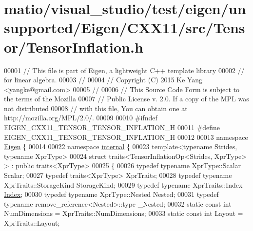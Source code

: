\hypertarget{matio_2visual__studio_2test_2eigen_2unsupported_2_eigen_2_c_x_x11_2src_2_tensor_2_tensor_inflation_8h_source}{}\section{matio/visual\+\_\+studio/test/eigen/unsupported/\+Eigen/\+C\+X\+X11/src/\+Tensor/\+Tensor\+Inflation.h}
\label{matio_2visual__studio_2test_2eigen_2unsupported_2_eigen_2_c_x_x11_2src_2_tensor_2_tensor_inflation_8h_source}

\begin{DoxyCode}
00001 \textcolor{comment}{// This file is part of Eigen, a lightweight C++ template library}
00002 \textcolor{comment}{// for linear algebra.}
00003 \textcolor{comment}{//}
00004 \textcolor{comment}{// Copyright (C) 2015 Ke Yang <yangke@gmail.com>}
00005 \textcolor{comment}{//}
00006 \textcolor{comment}{// This Source Code Form is subject to the terms of the Mozilla}
00007 \textcolor{comment}{// Public License v. 2.0. If a copy of the MPL was not distributed}
00008 \textcolor{comment}{// with this file, You can obtain one at http://mozilla.org/MPL/2.0/.}
00009 
00010 \textcolor{preprocessor}{#ifndef EIGEN\_CXX11\_TENSOR\_TENSOR\_INFLATION\_H}
00011 \textcolor{preprocessor}{#define EIGEN\_CXX11\_TENSOR\_TENSOR\_INFLATION\_H}
00012 
00013 \textcolor{keyword}{namespace }\hyperlink{namespace_eigen}{Eigen} \{
00014 
00022 \textcolor{keyword}{namespace }\hyperlink{namespaceinternal}{internal} \{
00023 \textcolor{keyword}{template}<\textcolor{keyword}{typename} Str\textcolor{keywordtype}{id}es, \textcolor{keyword}{typename} XprType>
00024 \textcolor{keyword}{struct }traits<TensorInflationOp<Strides, XprType> > : \textcolor{keyword}{public} traits<XprType>
00025 \{
00026   \textcolor{keyword}{typedef} \textcolor{keyword}{typename} XprType::Scalar Scalar;
00027   \textcolor{keyword}{typedef} traits<XprType> XprTraits;
00028   \textcolor{keyword}{typedef} \textcolor{keyword}{typename} XprTraits::StorageKind StorageKind;
00029   \textcolor{keyword}{typedef} \textcolor{keyword}{typename} XprTraits::Index \hyperlink{namespace_eigen_a62e77e0933482dafde8fe197d9a2cfde}{Index};
00030   \textcolor{keyword}{typedef} \textcolor{keyword}{typename} XprType::Nested Nested;
00031   \textcolor{keyword}{typedef} \textcolor{keyword}{typename} remove\_reference<Nested>::type \_Nested;
00032   \textcolor{keyword}{static} \textcolor{keyword}{const} \textcolor{keywordtype}{int} NumDimensions = XprTraits::NumDimensions;
00033   \textcolor{keyword}{static} \textcolor{keyword}{const} \textcolor{keywordtype}{int} Layout = XprTraits::Layout;

\end{DoxyCode}
